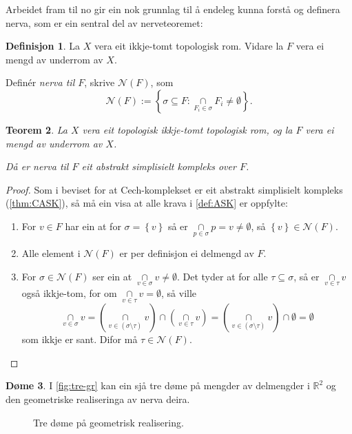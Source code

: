 \documentclass[a4paper, 12pt, norsk]{article}
\theoremstyle{plain}
\newtheorem{theorem}{Teorem}[section]
\theoremstyle{definition}
\newtheorem{definition}[theorem]{Definisjon}
\newtheorem{example}[theorem]{Døme}
\newcommand{\Rb}{\mathbb{R}}
\newcommand{\Nc}{\mathcal{N}}
\newcommand{\intersect}{ \mathop{\cap}\limits }
\newcommand{\set}[1]{ \left\{ #1 \right\} } %
\begin{document}
Arbeidet fram til no gir ein nok grunnlag til å endeleg kunna forstå og definera nerva, som er ein sentral del av nerveteoremet:

\begin{definition} \label{def:nerva}
	La $X$ vera eit ikkje-tomt topologisk rom. Vidare la $F$ vera ei mengd av underrom av $X$. 
	
	Definér \emph{nerva til $F$}, skrive $\Nc(F)$, som
	\begin{equation*}
		\Nc(F) := \left \{ \sigma \subseteq F : \intersect_{ F_i \in \sigma } F_i \neq \emptyset \right \}.
	\end{equation*}
\end{definition}

\begin{theorem}
	La $X$ vera eit topologisk ikkje-tomt topologisk rom, og la $F$ vera ei mengd av underrom av $X$.
	
	Då er nerva til $F$ eit abstrakt simplisielt kompleks over $F$.
\end{theorem}

\begin{proof}
	Som i beviset for at Cech-komplekset er eit abstrakt simplisielt kompleks (\autoref{thm:CASK}), så må ein visa at alle krava i \autoref{def:ASK} er oppfylte:
	\begin{enumerate}
		\item{ 
			For \( v \in F \) har ein at for \( \sigma = \set{ v } \) så er \( \intersect_{ p \in \sigma } p = v \neq \emptyset \), så \( \set{v} \in \Nc(F) \).
		}
		\item{ 
			Alle element i \( \Nc(F) \) er per definisjon ei delmengd av \( F \).
		}
		\item{  
			For \( \sigma \in \Nc(F) \) ser ein at \( \intersect_{v\in\sigma} v \neq \emptyset \). Det tyder at for alle \( \tau \subseteq \sigma \), så er \( \intersect_{v\in\tau} v \) også ikkje-tom, for om \( \intersect_{v\in\tau} v = \emptyset \), så ville 
			\[ 
				\intersect_{v\in\sigma} v = \left( \intersect_{v\in(\sigma\setminus\tau)} v \right) \intersect \left( \intersect_{v\in\tau} v \right) = \left( \intersect_{v\in(\sigma\setminus\tau)} v \right) \intersect \emptyset = \emptyset 
			\] 
			som ikkje er sant. Difor må \( \tau \in \Nc(F) \). \qedhere}
	\end{enumerate}
\end{proof}

\begin{example}
	I \autoref{fig:tre-gr} kan ein sjå tre døme på mengder av delmengder i \( \Rb^2 \) og den geometriske realiseringa av nerva deira.
	\begin{figure}[htbp]
		\begin{center}
			
		\end{center}
		\caption{Tre døme på geometrisk realisering.}
		\label{fig:tre-gr}
	\end{figure}
\end{example}
\end{document}
